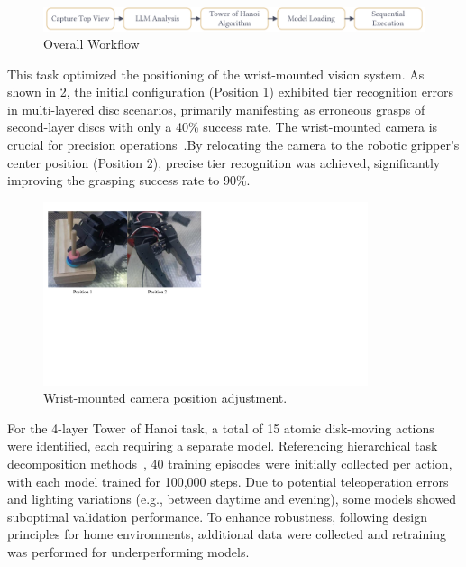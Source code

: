 \documentclass[runningheads]{llncs}
\begin{document}
\begin{figure}[htbp]
\centering
\includegraphics[width=\textwidth]{10}
\caption{Overall Workflow}
 \label{fig10}
\end{figure}

This task optimized the positioning of the wrist-mounted vision system. As shown in \cref{fig12}, the initial configuration (Position 1) exhibited tier recognition errors in multi-layered disc scenarios, primarily manifesting as erroneous grasps of second-layer discs with only a 40\% success rate. The wrist-mounted camera is crucial for precision operations~\cite{ref6}.By relocating the camera to the robotic gripper's center position (Position 2), precise tier recognition was achieved, significantly improving the grasping success rate to 90\%.

\begin{figure}[htbp]
\centering
\includegraphics[width=0.85\textwidth]{fig12.pdf}
\caption{Wrist-mounted camera position adjustment.} \label{fig12}
\end{figure}



For the 4-layer Tower of Hanoi task, a total of 15 atomic disk-moving actions were identified, each requiring a separate model. Referencing hierarchical task decomposition methods~\cite{ref7}, 40 training episodes were initially collected per action, with each model trained for 100,000 steps. Due to potential teleoperation errors and lighting variations (e.g., between daytime and evening)\cite{ref8}, some models showed suboptimal validation performance. To enhance robustness, following design principles for home environments\cite{ref9}, additional data were collected and retraining was performed for underperforming models.
\end{document}
